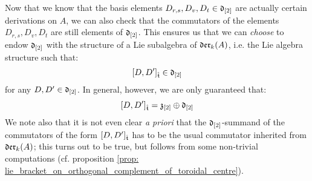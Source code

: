         \begin{remark}
            Now that we know that the basis elements $D_{r, s}, D_v, D_t \in \mathfrak{d}_{[2]}$ are actually certain derivations on $A$, we can also check that the commutators of the elements $D_{r, s}, D_v, D_t$ are still elements of $\mathfrak{d}_{[2]}$. This ensures us that we can \textit{choose} to endow $\mathfrak{d}_{[2]}$ with the structure of a Lie subalgebra of $\mathfrak{der}_k(A)$, i.e. the Lie algebra structure such that:
                $$[D, D']_{\hat{\mathfrak{t}}} \in \mathfrak{d}_{[2]}$$
            for any $D, D' \in \mathfrak{d}_{[2]}$. In general, however, we are only guaranteed that:
                $$[D, D']_{\hat{\mathfrak{t}}} = \mathfrak{z}_{[2]} \oplus \mathfrak{d}_{[2]}$$
            We note also that it is not even clear \textit{a priori} that the $\mathfrak{d}_{[2]}$-summand of the commutators of the form $[D, D']_{\hat{\mathfrak{t}}}$ has to be the usual commutator inherited from $\mathfrak{der}_k(A)$; this turns out to be true, but follows from some non-trivial computations (cf. proposition \ref{prop: lie_bracket_on_orthogonal_complement_of_toroidal_centre}). 
        \end{remark}

